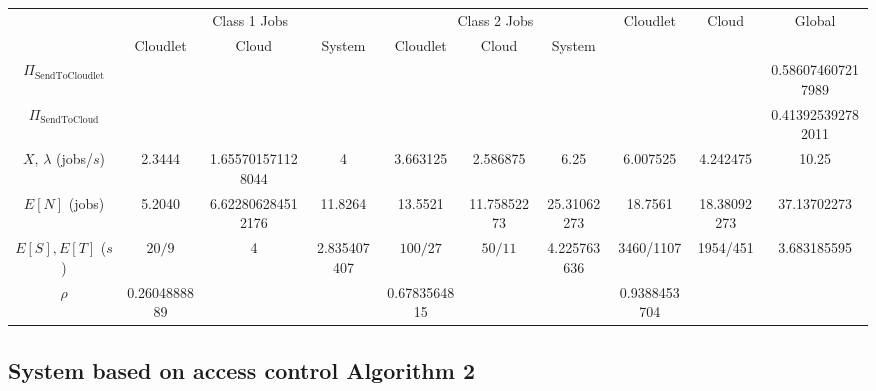 \documentclass[10pt,a4paper]{article}
\begin{document}
\begin{table}[h!]
    \centering
    \small
    \begin{adjustbox}{center=\textwidth}
     \begin{tabular}{c|c|c|c|c|c|c|c|c|c}

      \toprule
      
      & \multicolumn{3}{c|}{ Class 1 Jobs} & \multicolumn{3}{c|}{Class 2 Jobs} & \multirow{2}{*}{Cloudlet} & \multirow{2}{*}{Cloud} & \multirow{2}{*}{Global} \\ \cline{2-7}
      
      & Cloudlet & Cloud & System & Cloudlet & Cloud & System & \\
      \midrule
      $\Pi_{\text{SendToCloudlet}}$ & & & & & & & & & 0.586074607217989  \\
      \hline
      $\Pi_{\text{SendToCloud}}$ & & & & & & & & & 0.413925392782011  \\
      \hline
	  $X$, $\lambda$ (jobs/$s$) & 2.3444 & 1.655701571128044 & 4 & 3.663125 & 2.586875 & 6.25 & 6.007525 & 4.242475 & 10.25 \\     
      \hline
      $E[N]$ (jobs) & 5.2040 & 6.622806284512176 & 11.8264 & 13.5521 & 11.75852273 & 25.31062273 & 18.7561 & 18.38092273 & 37.13702273 \\
      \hline
      $E[S], E[T]$ ($s$)& $20/9$ & 4 & 2.835407407 & $100/27$ & $50/11$ & 4.225763636 & 3460/1107 & 1954/451 & 3.683185595 \\
      \hline
	  $\rho$ & 0.2604888889 & & & 0.6783564815 & &  & 0.9388453704 & &  \\
     
       
 
     
      \bottomrule

    \end{tabular}
    \end{adjustbox}
\end{table}



\newpage
\subsection{System based on access control Algorithm 2}
\end{document}
